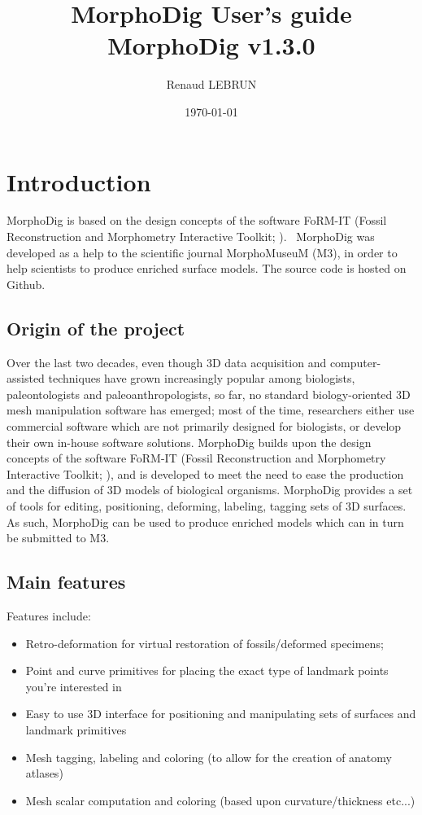 \documentclass[12pt, a4paper]{book}
\title{MorphoDig User's guide\\MorphoDig v1.3.0}
\author{Renaud LEBRUN}
\affil{Institut des Sciences de l'Evolution, University of Montpellier, France}
\date{\today}
\begin{document}
	\dominitoc

\maketitle


\tableofcontents

\chapter*{Introduction}


\minitoc 

 MorphoDig is based on the design concepts of the software FoRM-IT (Fossil Reconstruction and Morphometry Interactive Toolkit; \citep{Zollikofer1995,Zollikofer2005}).
\ MorphoDig\citep{Lebrun2018} was developed as a help to the scientific journal MorphoMuseuM (M3), in order to help scientists to produce enriched surface models. The source code is hosted on Github.   
\section*{Origin of the project}
Over the last two decades, even though 3D data acquisition and computer-assisted techniques have grown increasingly popular among biologists, paleontologists and paleoanthropologists, so far, no standard biology-oriented 3D mesh manipulation software has emerged; most of the time, researchers either use commercial software which are not primarily designed for biologists, or develop their own in-house software solutions.  MorphoDig builds upon the design concepts of the software FoRM-IT (Fossil Reconstruction and Morphometry Interactive Toolkit; \citep{Zollikofer1995,Zollikofer2005}), and is developed to meet the need to ease the production and the diffusion of 3D models of biological organisms. MorphoDig provides a set of tools for editing, positioning, deforming, labeling, tagging sets of 3D surfaces. As such, MorphoDig can be used to produce enriched models which can in turn be submitted to M3.
\section*{Main features}
Features include:
\begin{itemize}
\item Retro-deformation for virtual restoration of fossils/deformed specimens;
\item Point and curve primitives for placing the exact type of landmark points you’re interested in
\item Easy to use 3D interface for positioning and manipulating sets of surfaces and landmark primitives
\item Mesh tagging, labeling and coloring (to allow for the creation of anatomy atlases)
\item Mesh scalar computation and coloring (based upon curvature/thickness etc...)
\end{itemize}
\end{document}
